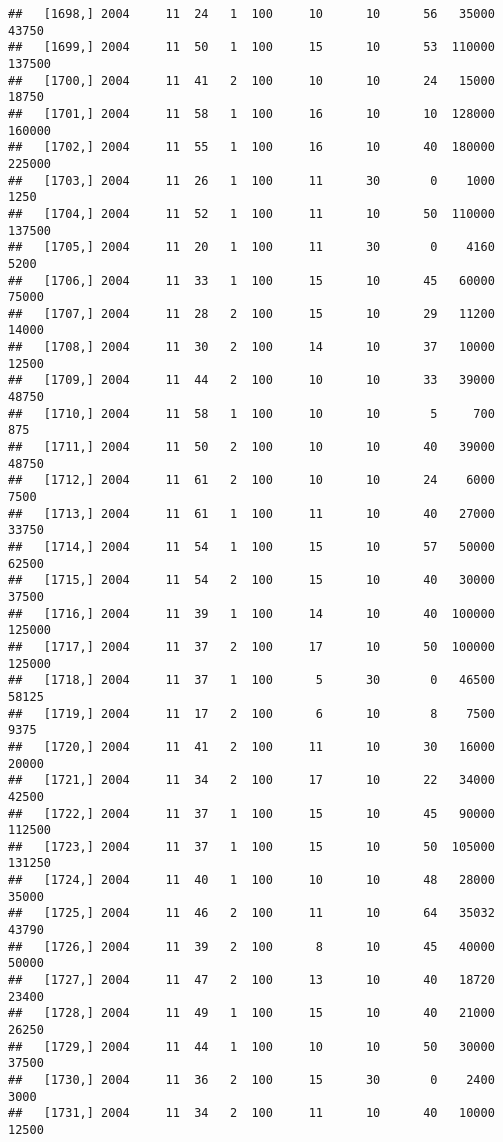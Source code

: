 \documentclass{article}\usepackage[]{graphicx}\usepackage[]{color}
\makeatletter
\newenvironment{kframe}{%
 \def\at@end@of@kframe{}%
 \ifinner\ifhmode%
  \def\at@end@of@kframe{\end{minipage}}%
  \begin{minipage}{\columnwidth}%
 \fi\fi%
 \def\FrameCommand##1{\hskip\@totalleftmargin \hskip-\fboxsep
 \colorbox{shadecolor}{##1}\hskip-\fboxsep
     \hskip-\linewidth \hskip-\@totalleftmargin \hskip\columnwidth}%
 \MakeFramed {\advance\hsize-\width
   \@totalleftmargin\z@ \linewidth\hsize
   \@setminipage}}%
 {\par\unskip\endMakeFramed%
 \at@end@of@kframe}
\newenvironment{knitrout}{}{} %
\makeatother
\begin{document}
\begin{knitrout}
\begin{kframe}
\begin{verbatim}
##   [1698,] 2004     11  24   1  100     10      10      56   35000   43750
##   [1699,] 2004     11  50   1  100     15      10      53  110000  137500
##   [1700,] 2004     11  41   2  100     10      10      24   15000   18750
##   [1701,] 2004     11  58   1  100     16      10      10  128000  160000
##   [1702,] 2004     11  55   1  100     16      10      40  180000  225000
##   [1703,] 2004     11  26   1  100     11      30       0    1000    1250
##   [1704,] 2004     11  52   1  100     11      10      50  110000  137500
##   [1705,] 2004     11  20   1  100     11      30       0    4160    5200
##   [1706,] 2004     11  33   1  100     15      10      45   60000   75000
##   [1707,] 2004     11  28   2  100     15      10      29   11200   14000
##   [1708,] 2004     11  30   2  100     14      10      37   10000   12500
##   [1709,] 2004     11  44   2  100     10      10      33   39000   48750
##   [1710,] 2004     11  58   1  100     10      10       5     700     875
##   [1711,] 2004     11  50   2  100     10      10      40   39000   48750
##   [1712,] 2004     11  61   2  100     10      10      24    6000    7500
##   [1713,] 2004     11  61   1  100     11      10      40   27000   33750
##   [1714,] 2004     11  54   1  100     15      10      57   50000   62500
##   [1715,] 2004     11  54   2  100     15      10      40   30000   37500
##   [1716,] 2004     11  39   1  100     14      10      40  100000  125000
##   [1717,] 2004     11  37   2  100     17      10      50  100000  125000
##   [1718,] 2004     11  37   1  100      5      30       0   46500   58125
##   [1719,] 2004     11  17   2  100      6      10       8    7500    9375
##   [1720,] 2004     11  41   2  100     11      10      30   16000   20000
##   [1721,] 2004     11  34   2  100     17      10      22   34000   42500
##   [1722,] 2004     11  37   1  100     15      10      45   90000  112500
##   [1723,] 2004     11  37   1  100     15      10      50  105000  131250
##   [1724,] 2004     11  40   1  100     10      10      48   28000   35000
##   [1725,] 2004     11  46   2  100     11      10      64   35032   43790
##   [1726,] 2004     11  39   2  100      8      10      45   40000   50000
##   [1727,] 2004     11  47   2  100     13      10      40   18720   23400
##   [1728,] 2004     11  49   1  100     15      10      40   21000   26250
##   [1729,] 2004     11  44   1  100     10      10      50   30000   37500
##   [1730,] 2004     11  36   2  100     15      30       0    2400    3000
##   [1731,] 2004     11  34   2  100     11      10      40   10000   12500

\end{verbatim}
\end{kframe}
\end{knitrout}
\end{document}
